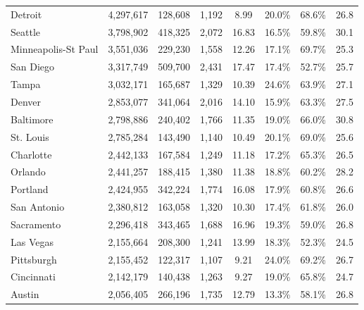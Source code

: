 \documentclass[letterpaper,12pt,dvipsnames,usenames]{article}
\theoremstyle{definition}
\begin{document}
\begin{spacing}{1.0}
\begin{small}
\begin{table}
\begin{center}
{\begin{tabular}{lccccccc}
    Detroit &               4,297,617  &          128,608  &          1,192  & 8.99  & 20.0\% & 68.6\% & 26.8\\
    Seattle &               3,798,902  &          418,325  &          2,072  & 16.83 & 16.5\% & 59.8\% & 30.1 \\
    Minneapolis-St Paul &               3,551,036  &          229,230  &          1,558  & 12.26 & 17.1\% & 69.7\% & 25.3\\
    San Diego &               3,317,749  &          509,700  &          2,431  & 17.47 & 17.4\% & 52.7\% & 25.7\\
    Tampa &               3,032,171  &          165,687  &          1,329  & 10.39 & 24.6\% & 63.9\% & 27.1\\
    Denver &               2,853,077  &          341,064  &          2,016  & 14.10 & 15.9\% & 63.3\% & 27.5 \\
    Baltimore &               2,798,886  &          240,402  &          1,766  & 11.35 & 19.0\% & 66.0\% & 30.8 \\
    St. Louis &               2,785,284  &          143,490  &          1,140  & 10.49 & 20.1\% & 69.0\% & 25.6\\
    Charlotte &               2,442,133  &          167,584  &          1,249  & 11.18 & 17.2\% & 65.3\% & 26.5\\
    Orlando &               2,441,257  &          188,415  &          1,380  & 11.38 & 18.8\% & 60.2\% & 28.2\\
    Portland &               2,424,955  &          342,224  &          1,774  & 16.08 & 17.9\% & 60.8\% & 26.6\\
    San Antonio &               2,380,812  &          163,058  &          1,320  & 10.30 & 17.4\% & 61.8\% & 26.0\\
    Sacramento &               2,296,418  &          343,465  &          1,688  & 16.96 & 19.3\% & 59.0\% & 26.8\\
    Las Vegas &               2,155,664  &          208,300  &          1,241  & 13.99 & 18.3\% & 52.3\% & 24.5\\
    Pittsburgh &               2,155,452  &          122,317  &          1,107  & 9.21  & 24.0\% & 69.2\% & 26.7\\
    Cincinnati &               2,142,179  &          140,438  &          1,263  & 9.27  & 19.0\% & 65.8\% & 24.7\\
    Austin &               2,056,405  &          266,196  &          1,735  & 12.79 & 13.3\% & 58.1\% & 26.8\\

\end{tabular}}
\end{center}
\end{table}
\end{small}
\end{spacing}
\end{document}
